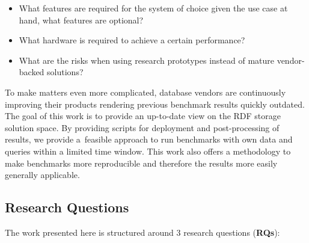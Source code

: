 \documentclass[twocolumn]{bmcart}%
\begin{document}
\begin{itemize}
	\item What features are required for the system of choice given the use case at hand, what features are optional?
	\item What hardware is required to achieve a certain performance?
	\item What are the risks when using research prototypes instead of mature vendor-backed solutions? 
\end{itemize}

To make matters even more complicated, database vendors are continuously improving their products rendering previous benchmark results quickly outdated.
The goal of this work is to provide an up-to-date view on the RDF storage solution space.
By providing scripts for deployment and post-processing of results, we provide a~feasible approach to run benchmarks with own data and queries within a limited time window.
This work also offers a methodology to make benchmarks more reproducible and therefore the results more easily generally applicable.

\subsection{Research Questions}

The work presented here is structured around 3 research questions (\textbf{RQs}):
\end{document}
